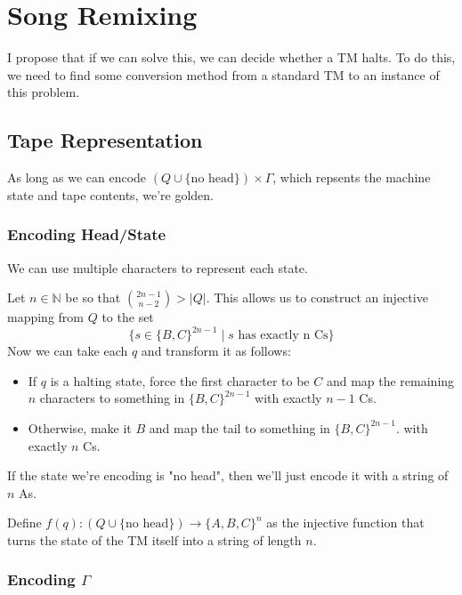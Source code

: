 \documentclass[12pt]{article}
\newcommand{\N}{\mathbb{N}}
\begin{document}
\pagebreak

\section{Song Remixing}

I propose that if we can solve this, we can decide whether a TM halts.
To do this, we need to find some conversion method from a standard TM
to an instance of this problem.

\subsection{Tape Representation}\label{sec:encodings}

As long as we can encode $(Q \cup \{\text{no head}\}) \times \Gamma$,
which repsents the machine state and tape contents, we're golden.

\subsubsection{Encoding Head/State}\label{sec:tmstate}

We can use multiple characters to represent each state.

Let $n \in \N$ be so that $\binom{2n-1}{n-2} > |Q|$.
This allows us to construct an injective mapping from $Q$ to the set
\[\{s \in \{B, C\}^{2n-1} \mid \text{$s$ has exactly n Cs}\}\]
Now we can take each $q$ and transform it as follows:
\begin{itemize}[nolistsep]
    \item If $q$ is a halting state, force the first character to be $C$
          and map the remaining $n$ characters to something in $\{B, C\}^{2n-1}$ with exactly $n-1$ Cs.
    \item Otherwise, make it $B$ and map the tail to something in $\{B, C\}^{2n-1}$. with exactly $n$ Cs.
\end{itemize}

If the state we're encoding is "no head", then we'll just encode it with a string of $n$ As.

Define $f(q): (Q \cup \{\text{no head}\}) \to \{A, B, C\}^n$ as the injective function
that turns the state of the TM itself into a string of length $n$.

\subsubsection{Encoding \texorpdfstring{$\Gamma$}{Gamma}}
\end{document}
